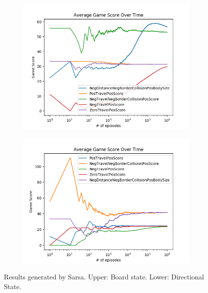 \documentclass[result.tex]{subfiles}
\begin{document}
    \newpage

    \begin{figure}[ht]
        \centering
        \begin{subfigure}[b]{.8\linewidth}
            \includegraphics[width=\linewidth]{../images/sarsa/reward/42/reward_sarsa_board_state_average_game_score_over_time.png}
        \end{subfigure}

        \begin{subfigure}[b]{.8\linewidth}
            \includegraphics[width=\linewidth]{../images/sarsa/reward/42/reward_sarsa_directional_state_average_game_score_over_time.png}
        \end{subfigure}
        \caption{Results generated by Sarsa. Upper: Board state. Lower: Directional State.}
        \label{fig:reward_result_sarsa}
    \end{figure}
\end{document}
